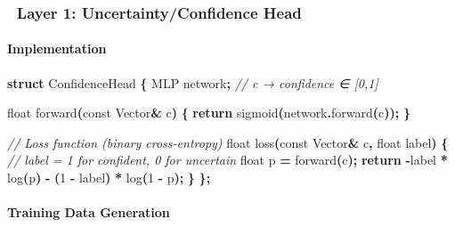 \documentclass[
  11pt,
  a4paper,
]{article}
\newenvironment{Shaded}{\begin{snugshade}}{\end{snugshade}}
\newcommand{\AttributeTok}[1]{\textcolor[rgb]{0.13,0.29,0.53}{#1}}
\newcommand{\CommentTok}[1]{\textcolor[rgb]{0.56,0.35,0.01}{\textit{#1}}}
\newcommand{\ControlFlowTok}[1]{\textcolor[rgb]{0.13,0.29,0.53}{\textbf{#1}}}
\newcommand{\DataTypeTok}[1]{\textcolor[rgb]{0.13,0.29,0.53}{#1}}
\newcommand{\DecValTok}[1]{\textcolor[rgb]{0.00,0.00,0.81}{#1}}
\newcommand{\KeywordTok}[1]{\textcolor[rgb]{0.13,0.29,0.53}{\textbf{#1}}}
\newcommand{\NormalTok}[1]{#1}
\newcommand{\OperatorTok}[1]{\textcolor[rgb]{0.81,0.36,0.00}{\textbf{#1}}}
\begin{document}
\subsubsection{🧩 Layer 1: Uncertainty/Confidence
Head}\label{layer-1-uncertaintyconfidence-head}

\paragraph{Implementation}\label{implementation-1}

\begin{Shaded}
\begin{Highlighting}[]
\KeywordTok{struct}\NormalTok{ ConfidenceHead }\OperatorTok{\{}
\NormalTok{    MLP network}\OperatorTok{;}  \CommentTok{// c → confidence ∈ [0,1]}
    
    \DataTypeTok{float}\NormalTok{ forward}\OperatorTok{(}\AttributeTok{const}\NormalTok{ Vector}\OperatorTok{\&}\NormalTok{ c}\OperatorTok{)} \OperatorTok{\{}
        \ControlFlowTok{return}\NormalTok{ sigmoid}\OperatorTok{(}\NormalTok{network}\OperatorTok{.}\NormalTok{forward}\OperatorTok{(}\NormalTok{c}\OperatorTok{));}
    \OperatorTok{\}}
    
    \CommentTok{// Loss function (binary cross{-}entropy)}
    \DataTypeTok{float}\NormalTok{ loss}\OperatorTok{(}\AttributeTok{const}\NormalTok{ Vector}\OperatorTok{\&}\NormalTok{ c}\OperatorTok{,} \DataTypeTok{float}\NormalTok{ label}\OperatorTok{)} \OperatorTok{\{}
        \CommentTok{// label = 1 for confident, 0 for uncertain}
        \DataTypeTok{float}\NormalTok{ p }\OperatorTok{=}\NormalTok{ forward}\OperatorTok{(}\NormalTok{c}\OperatorTok{);}
        \ControlFlowTok{return} \OperatorTok{{-}}\NormalTok{label }\OperatorTok{*}\NormalTok{ log}\OperatorTok{(}\NormalTok{p}\OperatorTok{)} \OperatorTok{{-}} \OperatorTok{(}\DecValTok{1} \OperatorTok{{-}}\NormalTok{ label}\OperatorTok{)} \OperatorTok{*}\NormalTok{ log}\OperatorTok{(}\DecValTok{1} \OperatorTok{{-}}\NormalTok{ p}\OperatorTok{);}
    \OperatorTok{\}}
\OperatorTok{\};}
\end{Highlighting}
\end{Shaded}

\paragraph{Training Data Generation}\label{training-data-generation}
\end{document}
